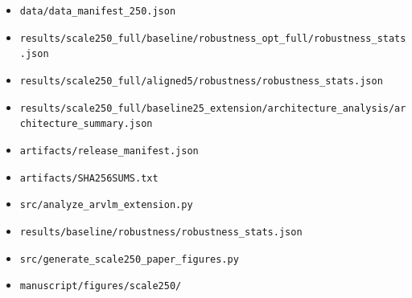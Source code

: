 \documentclass[10pt]{article}
\providecommand{\tightlist}{%
  \setlength{\itemsep}{0pt}\setlength{\parskip}{0pt}}
\begin{document}
\begin{itemize}
\tightlist
\item
  \texttt{data/data\_manifest\_250.json}
\item
  \texttt{results/scale250\_full/baseline/robustness\_opt\_full/robustness\_stats.json}
\item
  \texttt{results/scale250\_full/aligned5/robustness/robustness\_stats.json}
\item
  \texttt{results/scale250\_full/baseline25\_extension/architecture\_analysis/architecture\_summary.json}
\item
  \texttt{artifacts/release\_manifest.json}
\item
  \texttt{artifacts/SHA256SUMS.txt}
\item
  \texttt{src/analyze\_arvlm\_extension.py}
\item
  \texttt{results/baseline/robustness/robustness\_stats.json}
\item
  \texttt{src/generate\_scale250\_paper\_figures.py}
\item
  \texttt{manuscript/figures/scale250/}
\end{itemize}
\end{document}
